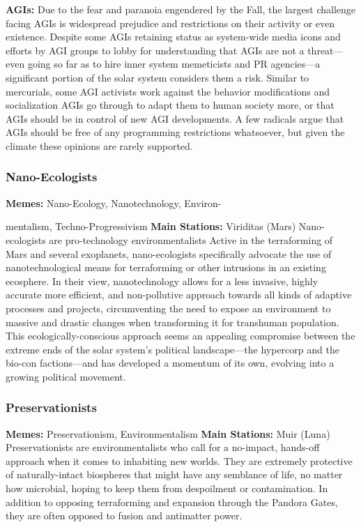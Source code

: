 \textbf{AGIs:} Due to the fear and paranoia engendered 
by the Fall, the largest challenge facing AGIs is widespread
prejudice and restrictions on their activity or
even existence. Despite some AGIs retaining status as 
system-wide media icons and efforts by AGI groups to 
lobby for understanding that AGIs are not a threat—
even going so far as to hire inner system memeticists 
and PR agencies—a significant portion of the solar 
system considers them a risk. Similar to mercurials, 
some AGI activists work against the behavior modifications
and socialization AGIs go through to adapt
them to human society more, or that AGIs should be 
in control of new AGI developments. A few radicals 
argue that AGIs should be free of any programming 
restrictions whatsoever, but given the climate these 
opinions are rarely supported.

\subsubsection{Nano-Ecologists}

\textbf{Memes:} Nano-Ecology, Nanotechnology, Environ-

mentalism, Techno-Progressivism
\textbf{Main Stations:} Viriditas (Mars)
Nano-ecologists are pro-technology environmentalists
Active in the terraforming of Mars and several
exoplanets, nano-ecologists specifically advocate the 
use of nanotechnological means for terraforming or 
other intrusions in an existing ecosphere. In their view, 
nanotechnology allows for a less invasive, highly accurate
more efficient, and non-pollutive approach
towards all kinds of adaptive processes and projects, 
circumventing the need to expose an environment to 
massive and drastic changes when transforming it for 
transhuman population. This ecologically-conscious 
approach seems an appealing compromise between 
the extreme ends of the solar system's political landscape—the
hypercorp and the bio-con factions—and
has developed a momentum of its own, evolving into 
a growing political movement.

\subsubsection{Preservationists}

\textbf{Memes:} Preservationism, Environmentalism
\textbf{Main Stations:} Muir (Luna)
Preservationists are environmentalists who call for 
a no-impact, hands-off approach when it comes to 
inhabiting new worlds. They are extremely protective 
of naturally-intact biospheres that might have any 
semblance of life, no matter how microbial, hoping 
to keep them from despoilment or contamination. 
In addition to opposing terraforming and expansion 
through the Pandora Gates, they are often opposed to 
fusion and antimatter power.

